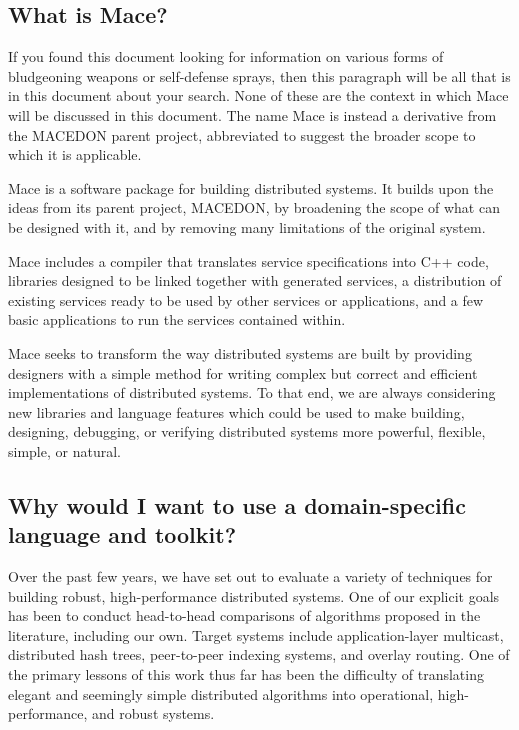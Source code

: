 \subsection{What is Mace?}
\label{sec:what-is-mace}

If you found this document looking for information on various forms of
bludgeoning weapons or self-defense sprays, then this paragraph will
be all that is in this document about your search.  None of these are
the context in which Mace will be discussed in this document.  The
name Mace is instead a derivative from the MACEDON parent project,
abbreviated to suggest the broader scope to which it is applicable.

Mace is a software package for building distributed systems.  It
builds upon the ideas from its parent project, MACEDON, by broadening
the scope of what can be designed with it, and by removing many
limitations of the original system.

Mace includes a compiler that translates service specifications into
C++ code, libraries designed to be linked together with generated
services, a distribution of existing services ready to be used by
other services or applications, and a few basic applications to run
the services contained within.

Mace seeks to transform the way distributed systems are built by
providing designers with a simple method for writing complex but
correct and efficient implementations of distributed systems.  To that
end, we are always considering new libraries and language features
which could be used to make building, designing, debugging, or
verifying distributed systems more powerful, flexible, simple, or
natural.

\subsection{Why would I want to use a domain-specific language and toolkit?}
\label{sec:why-new-toolkit}

Over the past few years, we have set out to evaluate a variety of
techniques for building robust, high-performance distributed systems.
One of our explicit goals has been to conduct head-to-head comparisons
of algorithms proposed in the literature, including our own.  Target
systems include application-layer multicast, distributed hash trees,
peer-to-peer indexing systems, and overlay routing.  One of the
primary lessons of this work thus far has been the difficulty of
translating elegant and seemingly simple distributed algorithms into
operational, high-performance, and robust systems.

